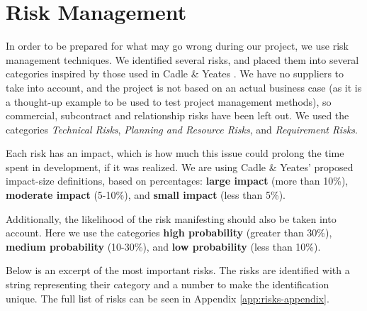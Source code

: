 \section{Risk Management}
\label{sec:RiskManagement}

In order to be prepared for what may go wrong during our project, we use risk management techniques.
We identified several risks, and placed them into several categories inspired by those used in Cadle
\& Yeates \cite{caye}. We have no suppliers to take into account, and the project is not
based on an actual business case (as it is a thought-up example to be used to test project management
methods), so commercial, subcontract and relationship risks have been left out. We used the categories
\emph{Technical Risks}, \emph{Planning and Resource Risks}, and \emph{Requirement Risks}.

Each risk has an impact, which is how much this issue could prolong the time spent in development,
if it was realized. We are using Cadle \& Yeates' proposed impact-size definitions, based on percentages:
\textbf{large impact} (more than 10\%), \textbf{moderate impact} (5-10\%), and \textbf{small impact}
(less than 5\%).

Additionally, the likelihood of the risk manifesting should also be taken into account. Here we use the
categories \textbf{high probability} (greater than 30\%), \textbf{medium probability} (10-30\%), and
\textbf{low probability} (less than 10\%).

Below is an excerpt of the most important risks. The risks are
identified with a string representing their category and a number to make the identification unique. The
full list of risks can be seen in Appendix \ref{app:risks-appendix}.

